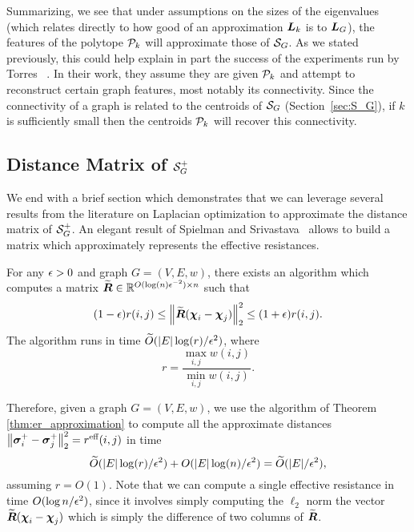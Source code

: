 Summarizing, we see  that under assumptions on the sizes of the eigenvalues (which relates  directly to  how good of an approximation $\L_k$ is to $\L_G$), the features of the  polytope $\P_k$  will  approximate  those of $\splx_G$. As we stated previously, this could help explain in part the success of the experiments run by Torres \etal~\cite{torres2019geometric}.  In their work, they assume they are given  $\P_k$ and  attempt to reconstruct certain  graph  features,  most notably its connectivity.  Since  the connectivity of  a  graph  is related to  the centroids of $\splx_G$ (Section~\ref{sec:S_G}), if $k$ is sufficiently small then  the centroids $\P_k$ will recover this connectivity.  




\subsection{Distance Matrix of \texorpdfstring{$\splx_G^+$}{the inverse combinatorial simplex}}
\label{sec:algorithmics_distance_matrix}
We end with  a brief section which demonstrates that we can leverage several results from the literature on Laplacian optimization to approximate the  distance matrix  of $\splx_G^+$. 
An elegant result of Spielman and Srivastava~\cite{spielman2011graph} allows to  build a matrix which approximately  represents the effective resistances.  


\begin{theorem}
	\label{thm:er_approximation}
	For any $\eps>0$ and graph $G=(V,E,w)$, there exists an algorithm which computes a matrix $\widetilde{\Reff}\in\R^{O(\log(n)\eps^{-2})\times n}$ such that 
	\begin{equation*}
	(1-\eps)r(i,j) \leq \norm{\widetilde{\Reff}(\bchi_i-\bchi_j)}_2^2 \leq (1+\eps) r(i,j).
	\end{equation*}
	The algorithm runs in time $\widetilde{O}( |E|\log (r)/\eps^2)$, where 
	\[r=\frac{\max_{i,j}w(i,j)}{\min_{i,j}w(i,j)}.\]
\end{theorem}


Therefore, given a graph $G=(V,E,w)$, we use the algorithm of Theorem \ref{thm:er_approximation} to compute all the approximate distances $\norm{\sv_i^+-\sv_j^+}_2^2=\effr(i,j)$ in time \[\widetilde{O}(|E|\log (r)/\eps^2)+O(|E| \log(n)/\eps^2)=\widetilde{O}(|E|/\eps^2),\]
assuming $r=O(1)$. Note that we can compute a single effective resistance in time $O(\log n/\eps^2)$, since it involves simply computing the $\ell_2$ norm the vector $\widetilde{\Reff}(\bchi_i-\bchi_j)$ which is simply the difference of two columns of $\widetilde{\Reff}$. 









